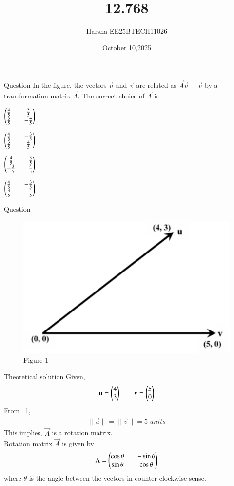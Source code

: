 \documentclass{beamer}
\title %
{12.768}
\date{October 10,2025}
\author %
{Harsha-EE25BTECH11026}
\begin{document}
\frame{\titlepage}


\begin{frame}{Question}
In the figure, the vectors $\vec{u}$ and $\vec{v}$ are related as $\vec{A}\vec{u}=\vec{v}$ by a transformation matrix $\vec{A}$. The correct choice of $\vec{A}$ is
\begin{enumerate}
\begin{multicols}{4}
    \item $\begin{pmatrix}\tfrac{4}{5}&&\tfrac{3}{5}\\\tfrac{3}{5}&&-\tfrac{4}{5}\end{pmatrix}$
    \item $\begin{pmatrix}\tfrac{4}{5}&&-\tfrac{3}{5}\\\tfrac{3}{5}&&\tfrac{4}{5}\end{pmatrix}$
    \item $\begin{pmatrix}\tfrac{4}{5}&&\tfrac{3}{5}\\-\tfrac{3}{5}&&\tfrac{4}{5}\end{pmatrix}$
    \item $\begin{pmatrix}\tfrac{4}{5}&&-\tfrac{3}{5}\\\tfrac{3}{5}&&-\tfrac{4}{5}\end{pmatrix}$
\end{multicols}
\end{enumerate}
\end{frame}
\begin{frame}{Question}
    \begin{figure}[H]
    \centering
    \includegraphics[width=0.4\columnwidth]{figs/Fig-1.png}
    \caption{Figure-1}
    \label{fig:1}
\end{figure}
\end{frame}


\begin{frame}{Theoretical solution}
    Given,
\begin{align}
    \mathbf{u}=\begin{pmatrix}4\\3\end{pmatrix} \qquad \mathbf{v}=\begin{pmatrix}5\\0\end{pmatrix}
\end{align}
From ~\ref{fig:1},
\begin{align}
    \|\vec{u}\|=\|\vec{v}\|=5 \; units
\end{align}
This implies, $\vec{A}$ is a rotation matrix.\\
Rotation matrix $\vec{A}$ is given by 
\begin{align}
    \mathbf{A}=\begin{pmatrix}\cos{\theta}&&-\sin{\theta}\\\sin{\theta}&&\cos{\theta}\end{pmatrix}
\end{align}
where $\theta$ is the angle between the vectors in counter-clockwise sense.
\end{frame}
\end{document}
